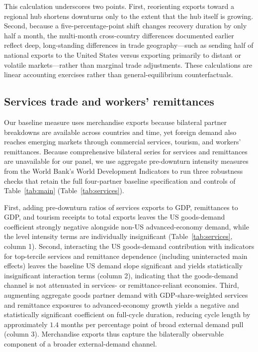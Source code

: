 \documentclass[12pt, a4paper]{article}
\begin{document}


This calculation underscores two points. First, reorienting exports toward a regional hub shortens downturns only to the extent that the hub itself is growing. Second, because a five-percentage-point shift changes recovery duration by only half a month, the multi-month cross-country differences documented earlier reflect deep, long-standing differences in trade geography---such as sending half of national exports to the United States versus exporting primarily to distant or volatile markets---rather than marginal trade adjustments. These calculations are linear accounting exercises rather than general-equilibrium counterfactuals.

\subsection{Services trade and workers' remittances}

Our baseline measure uses merchandise exports because bilateral partner breakdowns are available across countries and time, yet foreign demand also reaches emerging markets through commercial services, tourism, and workers' remittances. Because comprehensive bilateral series for services and remittances are unavailable for our panel, we use aggregate pre-downturn intensity measures from the World Bank's World Development Indicators to run three robustness checks that retain the full four-partner baseline specification and controls of Table~\ref{tab:main} (Table~\ref{tab:services}).

First, adding pre-downturn ratios of services exports to GDP, remittances to GDP, and tourism receipts to total exports leaves the US goods-demand coefficient strongly negative alongside non-US advanced-economy demand, while the level intensity terms are individually insignificant (Table~\ref{tab:services}, column 1). Second, interacting the US goods-demand contribution with indicators for top-tercile services and remittance dependence (including uninteracted main effects) leaves the baseline US demand slope significant and yields statistically insignificant interaction terms (column 2), indicating that the goods-demand channel is not attenuated in services- or remittance-reliant economies. Third, augmenting aggregate goods partner demand with GDP-share-weighted services and remittance exposures to advanced-economy growth yields a negative and statistically significant coefficient on full-cycle duration, reducing cycle length by approximately $1.4$ months per percentage point of broad external demand pull (column 3). Merchandise exports thus capture the bilaterally observable component of a broader external-demand channel.
\end{document}
